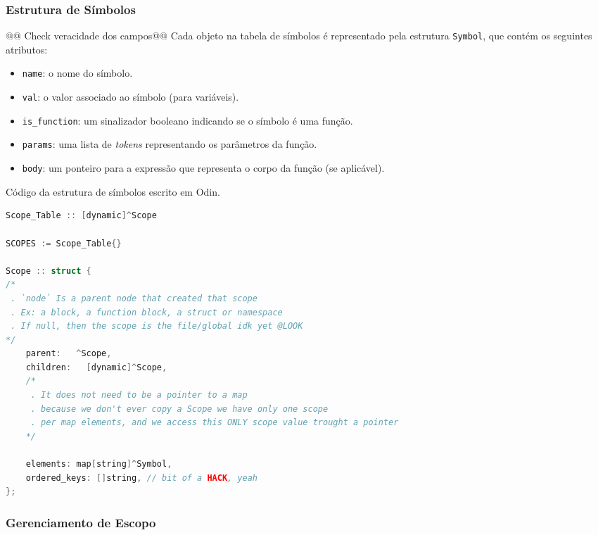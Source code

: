\subsubsection{Estrutura de Símbolos}


@@ Check veracidade dos campos@@
Cada objeto na tabela de símbolos é representado pela estrutura \texttt{Symbol}, que contém os seguintes atributos:
\begin{itemize}
    \item \texttt{name}: o nome do símbolo.
    \item \texttt{val}: o valor associado ao símbolo (para variáveis).
    \item \texttt{is\_function}: um sinalizador booleano indicando se o símbolo é uma função.
    \item \texttt{params}: uma lista de \textit{tokens} representando os parâmetros da função.
    \item \texttt{body}: um ponteiro para a expressão que representa o corpo da função (se aplicável).
\end{itemize}




\begin{codigo}[htb]
\caption{\small Código da estrutura de símbolos escrito em Odin.}
\label{struct-symbol}
\begin{lstlisting}[language=C]
Scope_Table :: [dynamic]^Scope

SCOPES := Scope_Table{}

Scope :: struct {
/*
 . `node` Is a parent node that created that scope
 . Ex: a block, a function block, a struct or namespace
 . If null, then the scope is the file/global idk yet @LOOK
*/
    parent:   ^Scope,
    children:   [dynamic]^Scope,
    /*
     . It does not need to be a pointer to a map
     . because we don't ever copy a Scope we have only one scope
     . per map elements, and we access this ONLY scope value trought a pointer
    */

    elements: map[string]^Symbol,
    ordered_keys: []string, // bit of a HACK, yeah
};

\end{lstlisting}
\end{codigo}


\subsubsection{Gerenciamento de Escopo}

